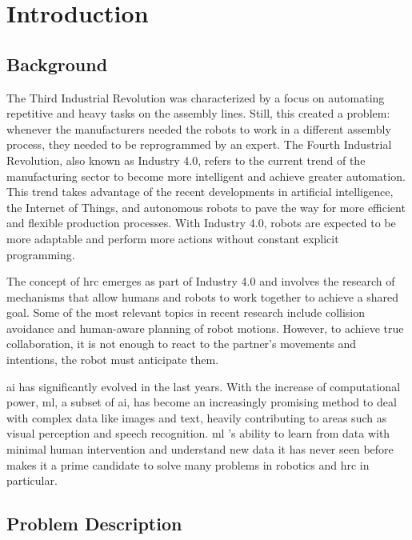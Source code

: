 \chapter{Introduction}
\label{chapter:introduction}

\section{Background}

The Third Industrial Revolution was characterized by a focus on automating repetitive and heavy tasks on the assembly lines. Still, this created a problem: whenever the manufacturers needed the robots to work in a different assembly process, they needed to be reprogrammed by an expert. The Fourth Industrial Revolution, also known as Industry 4.0, refers to the current trend of the manufacturing sector to become more intelligent and achieve greater automation. This trend takes advantage of the recent developments in artificial intelligence, the Internet of Things, and autonomous robots to pave the way for more efficient and flexible production processes. With Industry 4.0, robots are expected to be more adaptable and perform more actions without constant explicit programming.

The concept of \acf{hrc} emerges as part of Industry 4.0 and involves the research of mechanisms that allow humans and robots to work together to achieve a shared goal. Some of the most relevant topics in recent research include collision avoidance and human-aware planning of robot motions. However, to achieve true collaboration, it is not enough to react to the partner’s movements and intentions, the robot must anticipate them.

\acf{ai} has significantly evolved in the last years. With the increase of computational power, \acf{ml}, a subset of \acs{ai}, has become an increasingly promising method to deal with complex data like images and text, heavily contributing to areas such as visual perception and speech recognition. \acl{ml} ’s ability to learn from data with minimal human intervention and understand new data it has never seen before makes it a prime candidate to solve many problems in robotics and \acs{hrc} in particular.


\section{Problem Description}

